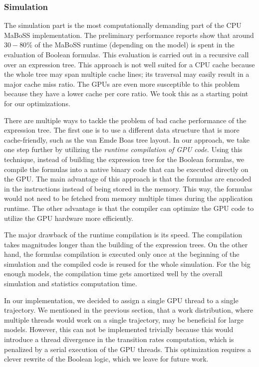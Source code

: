 \documentclass[times, twoside]{zHenriquesLab-StyleBioRxiv}
\begin{document}
\subsubsection*{Simulation}

The simulation part is the most computationally demanding part of the CPU MaBoSS implementation. The preliminary performance reports show that around $30-80\%$ of the MaBoSS runtime (depending on the model) is spent in the evaluation of Boolean formulas. This evaluation is carried out in a recursive call over an expression tree. This approach is not well suited for a CPU cache because the whole tree may span multiple cache lines; its traversal may easily result in a major cache miss ratio. The GPUs are even more susceptible to this problem because they have a lower cache per core ratio. We took this as a starting point for our optimizations.

There are multiple ways to tackle the problem of bad cache performance of the expression tree. The first one is to use a different data structure that is more cache-friendly, such as the van Emde Boas tree layout. In our approach, we take one step further by utilizing the \emph{runtime compilation of GPU code}. Using this technique, instead of building the expression tree for the Boolean formulas, we compile the formulas into a native binary code that can be executed directly on the GPU. The main advantage of this approach is that the formulas are encoded in the instructions instead of being stored in the memory. This way, the formulas would not need to be fetched from memory multiple times during the application runtime. The other advantage is that the compiler can optimize the GPU code to utilize the GPU hardware more efficiently. 

The major drawback of the runtime compilation is its speed. The compilation takes magnitudes longer than the building of the expression trees. On the other hand, the formulas compilation is executed only once at the beginning of the simulation and the compiled code is reused for the whole simulation. For the big enough models, the compilation time gets amortized well by the overall simulation and statistics computation time.

In our implementation, we decided to assign a single GPU thread to a single trajectory. We mentioned in the previous section, that a work distribution, where multiple threads would work on a single trajectory, may be beneficial for large models. However, this can not be implemented trivially because this would introduce a thread divergence in the transition rates computation, which is penalized by a serial execution of the GPU threads. This optimization requires a clever rewrite of the Boolean logic, which we leave for future work.
\end{document}
